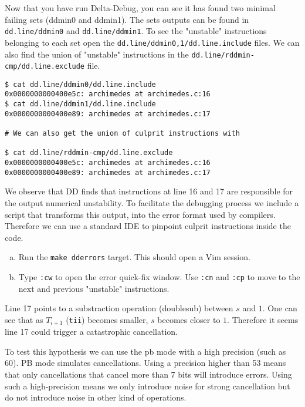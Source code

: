 Now that you have run Delta-Debug, you can see it has found two minimal failing sets (ddmin0 and ddmin1). The sets outputs can be found in \texttt{dd.line/ddmin0} and \texttt{dd.line/ddmin1}. To see the "unstable" instructions belonging to each set open the  \texttt{dd.line/ddmin{0,1}/dd.line.include} files. We can also find the union of "unstable" instructions in the \texttt{dd.line/rddmin-cmp/dd.line.exclude} file.

\begin{verbatim}
$ cat dd.line/ddmin0/dd.line.include
0x0000000000400e5c: archimedes at archimedes.c:16
$ cat dd.line/ddmin1/dd.line.include
0x0000000000400e89: archimedes at archimedes.c:17

# We can also get the union of culprit instructions with

$ cat dd.line/rddmin-cmp/dd.line.exclude
0x0000000000400e5c: archimedes at archimedes.c:16
0x0000000000400e89: archimedes at archimedes.c:17
\end{verbatim}

We observe that DD finds that instructions at line 16 and 17 are responsible for the output numerical unstability. To facilitate the debugging process we include a script that
transforms this output, into the error format used by compilers. Therefore we can use
a standard IDE to pinpoint culprit instructions inside the code.

\begin{question}
  \begin{enumerate}[(a)]
    \item Run the \texttt{make dderrors} target. This should open a Vim session.
    \item Type \texttt{:cw} to open the error quick-fix window. Use \texttt{:cn} and \texttt{:cp} to move to the next and previous "unstable" instructions.
  \end{enumerate}
\end{question}

Line 17 points to a substraction operation (doublesub) between $s$ and $1$. One can see that as $T_{i+1}$ (\texttt{tii}) becomes smaller, $s$ becomes closer to $1$. Therefore it seems line 17 could trigger a catastrophic cancellation.

To test this hypothesis we can use the pb mode with a high precision (such as
60).  PB mode simulates cancellations. Using a precision higher than 53 means
that only cancellations that cancel more than 7 bits will introduce errors.
Using such a high-precision means we only introduce noise for strong
cancellation but do not introduce noise in other kind of operations.

